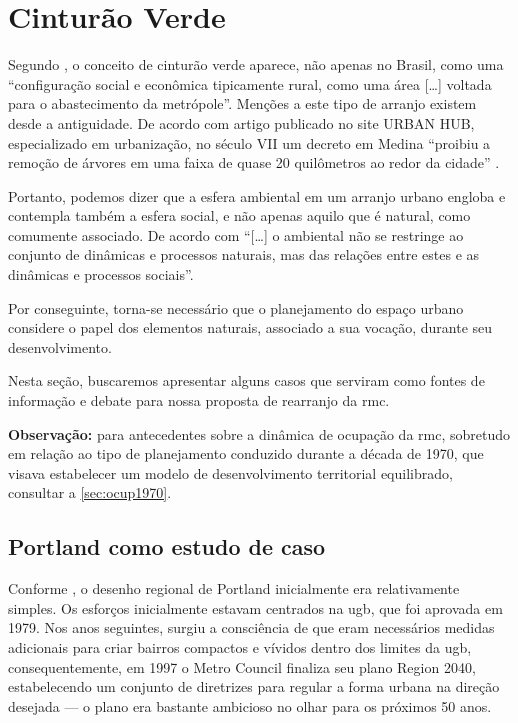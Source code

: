 	\section{Cinturão Verde}
	
	Segundo , o conceito de cinturão verde aparece, não apenas no Brasil, como uma ``configuração social e econômica tipicamente rural, como uma área [\dots] voltada para o abastecimento da metrópole''. Menções a este tipo de arranjo existem desde a antiguidade. De acordo com artigo publicado no site URBAN HUB, especializado em urbanização, no século VII um decreto em Medina ``proibiu a remoção de árvores em uma faixa de quase 20 quilômetros ao redor da cidade'' \cite{urbanhub2017a}.
	
	Portanto, podemos dizer que a esfera ambiental em um arranjo urbano engloba e contempla também a esfera social, e não apenas aquilo que é natural, como comumente associado. De acordo com
	 ``[\dots] o ambiental não se restringe ao conjunto de dinâmicas e processos naturais, mas das relações entre estes e as dinâmicas e processos sociais''.
	
	Por conseguinte, torna-se necessário que o planejamento do espaço urbano considere o papel dos elementos naturais, associado a sua vocação, durante seu desenvolvimento.
	
	Nesta seção, buscaremos apresentar alguns casos que serviram como fontes de informação e debate para nossa proposta de rearranjo da \glsdesc{rmc}.
	
	\textbf{Observação:} para antecedentes sobre a dinâmica de ocupação da \glsdesc{rmc}, sobretudo em relação ao tipo de planejamento conduzido durante a década de 1970, que visava estabelecer um modelo de desenvolvimento territorial equilibrado, consultar a \autoref{sec:ocup1970}.
	
	\subsection{Portland como estudo de caso}
	
	Conforme , o desenho regional de Portland inicialmente era relativamente simples. Os esforços inicialmente estavam centrados na \gls{ugb}, que foi aprovada em 1979. Nos anos seguintes, surgiu a consciência de que eram necessários medidas adicionais para criar bairros compactos e vívidos dentro dos limites da \gls{ugb}, consequentemente, em 1997 o Metro Council finaliza seu plano Region 2040, estabelecendo um conjunto de diretrizes para regular a forma urbana na direção desejada --- o plano era bastante ambicioso no olhar para os próximos 50 anos.
	
